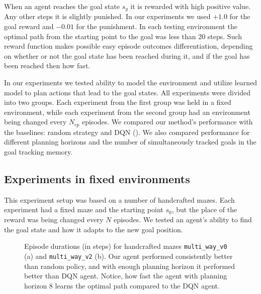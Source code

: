 \documentclass[a4paper,twoside]{article}
\begin{document}
When an agent reaches the goal state $s_g$ it is rewarded with high positive value. Any other steps it is slightly punished. In our experiments we used $+1.0$ for the goal reward and $-0.01$ for the punishment. In each testing environment the optimal path from the starting point to the goal was less than 20 steps. Such reward function makes possible easy episode outcomes differentiation, depending on whether or not the goal state has been reached during it, and if the goal has been reached then how fast.

In our experiments we tested ability to model the environment and utilize learned model to plan actions that lead to the goal states. All experiments were divided into two groups. Each experiment from the first group was held in a fixed environment, while each experiment from the second group had an environment being changed every $N_{ep}$ episodes. We compared our method's performance with the baselines: random strategy and DQN (\cite{Mnih_2015_Atari}). We also compared performance for different planning horizons and the number of simultaneously tracked goals in the goal tracking memory.

\subsection{Experiments in fixed environments}

This experiment setup was based on a number of handcrafted mazes. Each experiment had a fixed maze and the starting point $s_0$, but the place of the reward was being changed every $N$ episodes. We tested an agent's ability to find the goal state and how it adapts to the new goal position.

\begin{figure}
  \centering
  \begin{minipage}{\linewidth}
    
    \subcaption{}
    \vspace*{12pt}

    
    \subcaption{}
    \vspace*{6pt}
  \end{minipage}

  \caption{Episode durations (in steps) for handcrafted mazes \texttt{multi\_way\_v0} (a) and \texttt{multi\_way\_v2} (b). Our agent performed consistently better than random policy, and with enough planning horizon it performed better than DQN agent. Notice, how fast the agent with planning horizon $8$ learns the optimal path compared to the DQN agent.} \label{fig_comparison_mw}
\end{figure}
\end{document}
